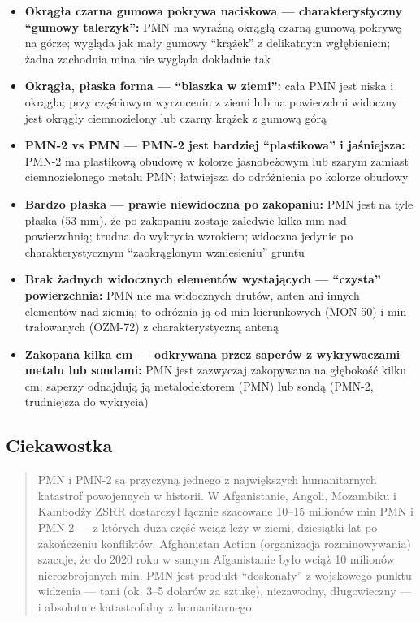 \documentclass[12pt,oneside]{book}
\providecommand{\tightlist}{%
  \setlength{\itemsep}{0pt}\setlength{\parskip}{0pt}}
\begin{document}
\begin{itemize}
\tightlist
\item
  \textbf{Okrągła czarna gumowa pokrywa naciskowa --- charakterystyczny
  ``gumowy talerzyk'':} PMN ma wyraźną okrągłą czarną gumową pokrywę na
  górze; wygląda jak mały gumowy ``krążek'' z delikatnym wgłębieniem;
  żadna zachodnia mina nie wygląda dokładnie tak
\item
  \textbf{Okrągła, płaska forma --- ``blaszka w ziemi'':} cała PMN jest
  niska i okrągła; przy częściowym wyrzuceniu z ziemi lub na powierzchni
  widoczny jest okrągły ciemnozielony lub czarny krążek z gumową górą
\item
  \textbf{PMN-2 vs PMN --- PMN-2 jest bardziej ``plastikowa'' i
  jaśniejsza:} PMN-2 ma plastikową obudowę w kolorze jasnobeżowym lub
  szarym zamiast ciemnozielonego metalu PMN; łatwiejsza do odróżnienia
  po kolorze obudowy
\item
  \textbf{Bardzo płaska --- prawie niewidoczna po zakopaniu:} PMN jest
  na tyle płaska (53 mm), że po zakopaniu zostaje zaledwie kilka mm nad
  powierzchnią; trudna do wykrycia wzrokiem; widoczna jedynie po
  charakterystycznym ``zaokrąglonym wzniesieniu'' gruntu
\item
  \textbf{Brak żadnych widocznych elementów wystających --- ``czysta''
  powierzchnia:} PMN nie ma widocznych drutów, anten ani innych
  elementów nad ziemią; to odróżnia ją od min kierunkowych (MON-50) i
  min trałowanych (OZM-72) z charakterystyczną anteną
\item
  \textbf{Zakopana kilka cm --- odkrywana przez saperów z wykrywaczami
  metalu lub sondami:} PMN jest zazwyczaj zakopywana na głębokość kilku
  cm; saperzy odnajdują ją metalodektorem (PMN) lub sondą (PMN-2,
  trudniejsza do wykrycia)
\end{itemize}

\subsection{Ciekawostka}\label{ciekawostka-122}

\begin{quote}
PMN i PMN-2 są przyczyną jednego z największych humanitarnych katastrof
powojennych w historii. W Afganistanie, Angoli, Mozambiku i Kambodży
ZSRR dostarczył łącznie szacowane 10--15 milionów min PMN i PMN-2 --- z
których duża część wciąż leży w ziemi, dziesiątki lat po zakończeniu
konfliktów. Afghanistan Action (organizacja rozminowywania) szacuje, że
do 2020 roku w samym Afganistanie było wciąż 10 milionów nierozbrojonych
min. PMN jest produkt ``doskonały'' z wojskowego punktu widzenia ---
tani (ok. 3--5 dolarów za sztukę), niezawodny, długowieczny --- i
absolutnie katastrofalny z humanitarnego.
\end{quote}
\end{document}
